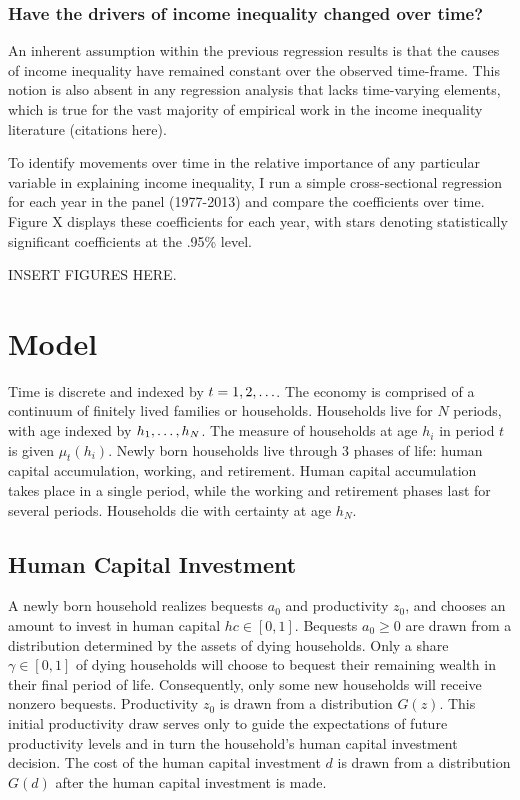 \documentclass[11pt]{article}
\theoremstyle{definition}
\numberwithin{equation}{section}
\begin{document}
\subsubsection{Have the drivers of income inequality changed over time?}
An inherent assumption within the previous regression results is that the causes of income inequality have remained constant over the observed time-frame. This notion is also absent in any regression analysis that lacks time-varying elements, which is true for the vast majority of empirical work in the income inequality literature (citations here). 

To identify movements over time in the relative importance of any particular variable in explaining income inequality, I run a simple cross-sectional regression for each year in the panel (1977-2013) and compare the coefficients over time. Figure X displays these coefficients for each year, with stars denoting statistically significant coefficients at the .95\% level. 

INSERT FIGURES HERE.




\section{Model}
Time is discrete and indexed by $t = 1,2,\mathellipsis$. The economy is comprised of a continuum of finitely lived families or households. Households live for $N$ periods, with age indexed by $h_1, \mathellipsis, h_N$. The measure of households at age $h_i$ in period $t$ is given $\mu_t(h_i)$. Newly born households live through 3 phases of life: human capital accumulation, working, and retirement. Human capital accumulation takes place in a single period, while the working and retirement phases last for several periods. Households die with certainty at age $h_N$.

\subsection{Human Capital Investment}
A newly born household realizes bequests $a_0$ and productivity $z_0$, and chooses an amount to invest in human capital $hc\in[0,1]$. Bequests $a_0\geq 0$ are drawn from a distribution determined by the assets of dying households. Only a share $\gamma\in[0,1]$ of dying households will choose to bequest their remaining wealth in their final period of life. Consequently, only some new households will receive nonzero bequests. Productivity $z_0$ is drawn from a distribution $G(z)$. This initial productivity draw serves only to guide the expectations of future productivity levels and in turn the household's human capital investment decision. The cost of the human capital investment $d$ is drawn from a distribution $G(d)$ after the human capital investment is made.
\end{document}
